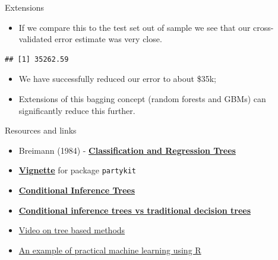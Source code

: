 \documentclass[
  10pt,
  ignorenonframetext,
]{beamer}
\newenvironment{Shaded}{}{}
\newcommand{\KeywordTok}[1]{\textcolor[rgb]{0.00,0.00,1.00}{#1}}
\newcommand{\NormalTok}[1]{#1}
\newcommand{\OperatorTok}[1]{#1}
\newcommand{\StringTok}[1]{\textcolor[rgb]{0.00,0.50,0.50}{#1}}
\providecommand{\tightlist}{%
  \setlength{\itemsep}{0pt}\setlength{\parskip}{0pt}}
\begin{document}
\begin{frame}[fragile]{Extensions}
\protect\hypertarget{extensions}{}

\begin{itemize}
\tightlist
\item
  If we compare this to the test set out of sample we see that our
  cross-validated error estimate was very close.
\end{itemize}

\begin{Shaded}
\end{Shaded}

\begin{verbatim}
## [1] 35262.59
\end{verbatim}

\begin{itemize}
\tightlist
\item
  We have successfully reduced our error to about \$35k;
\item
  Extensions of this bagging concept (random forests and GBMs) can
  significantly reduce this further.
\end{itemize}

\end{frame}

\begin{frame}[fragile]{Resources and links}
\protect\hypertarget{resources-and-links}{}

\begin{itemize}
\item
  Breimann (1984) -
  \href{https://www.amazon.com/Classification-Regression-Wadsworth-Statistics-Probability/dp/0412048418}{\textbf{Classification
  and Regression Trees}}
\item
  \href{https://cran.r-project.org/web/packages/partykit/vignettes/ctree.pdf}{\textbf{Vignette}}
  for package \texttt{partykit}
\item
  \href{https://rpubs.com/awanindra01/ctree}{\textbf{Conditional
  Inference Trees}}
\item
  \href{https://stats.stackexchange.com/questions/12140/conditional-inference-trees-vs-traditional-decision-trees}{\textbf{Conditional
  inference trees vs traditional decision trees}}
\item
  \href{https://www.youtube.com/watch?v=6ENTbK3yQUQ}{Video on tree based
  methods}
\item
  \href{https://rstudio-pubs-static.s3.amazonaws.com/64455_df98186f15a64e0ba37177de8b4191fa.html}{An
  example of practical machine learning using R}
\end{itemize}

\end{frame}
\end{document}
